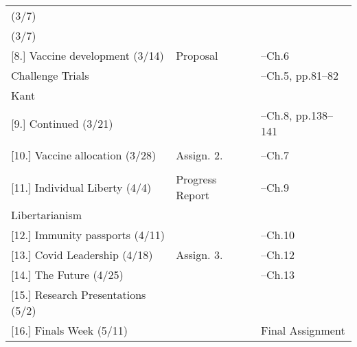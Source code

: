 \documentclass[article,oneside]{memoir}
\begin{document}
\begin{landscape}
\begin{center}
\begin{longtable}{p{6cm}p{6cm}p{4cm}}
 (3/7) & &  \\
 (3/7) & &  \\ [1.8\baselineskip]  \hline

 							

[8.] Vaccine development (3/14)	 			& Proposal				& --Ch.6 \\ 
Challenge Trials				 	 		&						& --Ch.5, pp.81--82  \\ 
Kant										&						&    	\\ [1.8\baselineskip] \hline		

[9.] Continued	(3/21)			 			&  						&  --Ch.8, pp.138--141\\ 
										&						&    	\\ [1.8\baselineskip] \hline	 

[10.] Vaccine allocation (3/28)		 			& Assign. 2.				& --Ch.7  \\
	    									&      						&  \\  [1.8\baselineskip] \hline


[11.] Individual Liberty (4/4)					& Progress Report			& --Ch.9  \\ 
Libertarianism								&						& 	 \\ [1.8\baselineskip] \hline				


[12.] Immunity passports  (4/11) 	 			&  			    			 & --Ch.10 \\ [1.8\baselineskip] \hline

[13.] Covid Leadership  (4/18) 					&  Assign. 3.    		  		 & --Ch.12   \\ [1.8\baselineskip] \hline


[14.] The Future  (4/25) 			 			& 		     				 & --Ch.13   \\ [1.8\baselineskip] \hline


[15.] Research Presentations	(5/2)			 	&						&  \\ [1.8\baselineskip] \hline

[16.] Finals Week (5/11)						&						 & Final Assignment \\ [1.8\baselineskip] \hline
	

\end{longtable}
\end{center}
\end{landscape}
\end{document}
